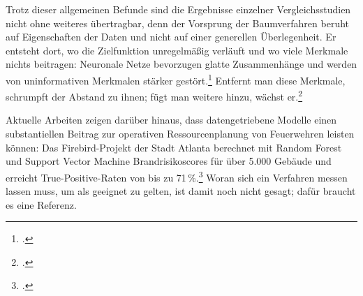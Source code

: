 \documentclass[12pt,a4paper]{article}
\begin{document}
Trotz dieser allgemeinen Befunde sind die Ergebnisse einzelner Vergleichsstudien nicht ohne weiteres übertragbar, denn der Vorsprung der Baumverfahren beruht auf Eigenschaften der Daten und nicht auf einer generellen Überlegenheit. Er entsteht dort, wo die Zielfunktion unregelmäßig verläuft und wo viele Merkmale nichts beitragen: Neuronale Netze bevorzugen glatte Zusammenhänge und werden von uninformativen Merkmalen stärker gestört.\footcite[6-7]{Grinsztajn2022} Entfernt man diese Merkmale, schrumpft der Abstand zu ihnen; fügt man weitere hinzu, wächst er.\footcite[7]{Grinsztajn2022}

Aktuelle Arbeiten zeigen darüber hinaus, dass datengetriebene Modelle einen substantiellen Beitrag
zur operativen Ressourcenplanung von Feuerwehren leisten können: Das Firebird-Projekt der Stadt
Atlanta berechnet mit Random Forest und Support Vector Machine Brandrisikoscores für über 5.000 Gebäude und erreicht
True-Positive-Raten von bis zu 71\,\%.\footcite[185-186]{Madaio2016} Woran sich ein Verfahren messen
lassen muss, um als geeignet zu gelten, ist damit noch nicht gesagt; dafür braucht es eine Referenz.

\end{document}
